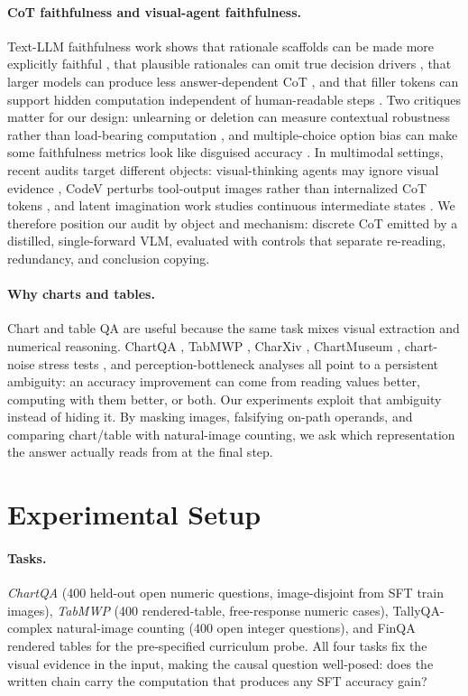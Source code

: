 \documentclass[11pt]{article}
\begin{document}
\paragraph{CoT faithfulness and visual-agent faithfulness.}
Text-LLM faithfulness work shows that rationale scaffolds can be made more explicitly faithful \citep{lyu2023}, that plausible rationales can omit true decision drivers \citep{turpin2023}, that larger models can produce less answer-dependent CoT \citep{lanham2023}, and that filler tokens can support hidden computation independent of human-readable steps \citep{pfau2024}. Two critiques matter for our design: unlearning or deletion can measure contextual robustness rather than load-bearing computation \citep{tutek2025}, and multiple-choice option bias can make some faithfulness metrics look like disguised accuracy \citep{bentham2024}. In multimodal settings, recent audits target different objects: visual-thinking agents may ignore visual evidence \citep{visualthinking2025}, CodeV perturbs tool-output images rather than internalized CoT tokens \citep{codev}, and latent imagination work studies continuous intermediate states \citep{capimagine2026}. We therefore position our audit by object and mechanism: discrete CoT emitted by a distilled, single-forward VLM, evaluated with controls that separate re-reading, redundancy, and conclusion copying.

\paragraph{Why charts and tables.}
Chart and table QA are useful because the same task mixes visual extraction and numerical reasoning. ChartQA \citep{chartqa}, TabMWP \citep{tabmwp}, CharXiv \citep{charxiv}, ChartMuseum \citep{chartmuseum}, chart-noise stress tests \citep{chartnoise}, and perception-bottleneck analyses \citep{perceptionbottleneck} all point to a persistent ambiguity: an accuracy improvement can come from reading values better, computing with them better, or both. Our experiments exploit that ambiguity instead of hiding it. By masking images, falsifying on-path operands, and comparing chart/table with natural-image counting, we ask which representation the answer actually reads from at the final step.

\section{Experimental Setup}
\label{sec:setup}

\paragraph{Tasks.}
\emph{ChartQA} \citep{chartqa} (400 held-out open numeric questions, image-disjoint from SFT train images), \emph{TabMWP} \citep{tabmwp} (400 rendered-table, free-response numeric cases), TallyQA-complex natural-image counting (400 open integer questions), and FinQA rendered tables for the pre-specified curriculum probe. All four tasks fix the visual evidence in the input, making the causal question well-posed: does the written chain carry the computation that produces any SFT accuracy gain?
\end{document}
